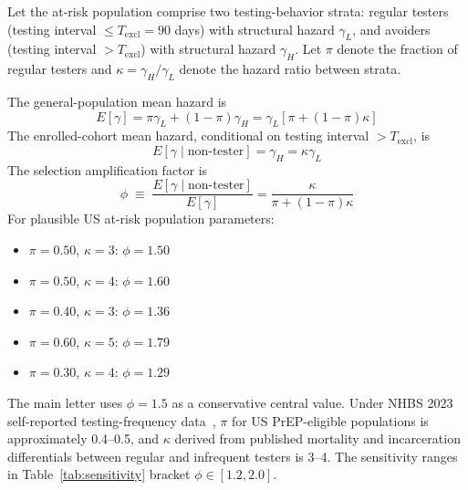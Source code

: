 \documentclass[11pt]{article}
\begin{document}
Let the at-risk population comprise two testing-behavior strata: regular testers (testing interval $\leq T_{\mathrm{excl}} = 90$ days) with structural hazard $\gamma_L$, and avoiders (testing interval $> T_{\mathrm{excl}}$) with structural hazard $\gamma_H$. Let $\pi$ denote the fraction of regular testers and $\kappa = \gamma_H/\gamma_L$ denote the hazard ratio between strata.

The general-population mean hazard is
\begin{equation}
E[\gamma] = \pi \gamma_L + (1-\pi) \gamma_H = \gamma_L [\pi + (1-\pi)\kappa]
\end{equation}
The enrolled-cohort mean hazard, conditional on testing interval $> T_{\mathrm{excl}}$, is
\begin{equation}
E[\gamma \mid \text{non-tester}] = \gamma_H = \kappa \gamma_L
\end{equation}
The selection amplification factor is
\begin{equation}
\phi \;\equiv\; \frac{E[\gamma \mid \text{non-tester}]}{E[\gamma]} = \frac{\kappa}{\pi + (1-\pi)\kappa} \label{eq:phi}
\end{equation}
For plausible US at-risk population parameters:
\begin{itemize}
\item $\pi = 0.50$, $\kappa = 3$: $\phi = 1.50$
\item $\pi = 0.50$, $\kappa = 4$: $\phi = 1.60$
\item $\pi = 0.40$, $\kappa = 3$: $\phi = 1.36$
\item $\pi = 0.60$, $\kappa = 5$: $\phi = 1.79$
\item $\pi = 0.30$, $\kappa = 4$: $\phi = 1.29$
\end{itemize}
The main letter uses $\phi = 1.5$ as a conservative central value. Under NHBS 2023 self-reported testing-frequency data~\cite{nhbs2023}, $\pi$ for US PrEP-eligible populations is approximately 0.4--0.5, and $\kappa$ derived from published mortality and incarceration differentials between regular and infrequent testers is 3--4. The sensitivity ranges in Table~\ref{tab:sensitivity} bracket $\phi \in [1.2, 2.0]$.
\end{document}
